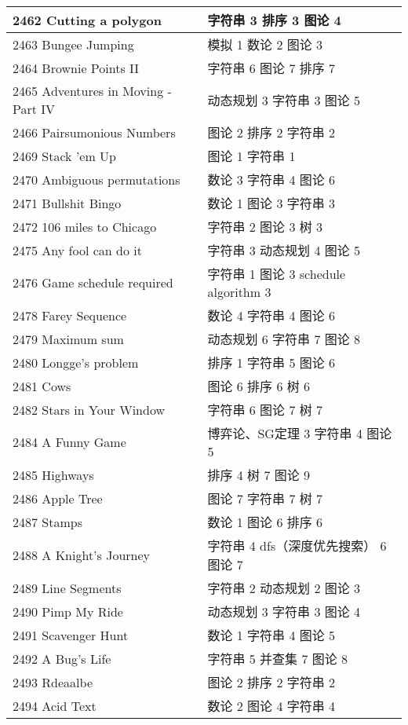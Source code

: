 \begin{longtable}{| p{} | p{} |}
 2462 Cutting a polygon  & 字符串 3 排序 3 图论 4 \\ \hline
 2463 Bungee Jumping  & 模拟 1 数论 2 图论 3 \\ \hline
 2464 Brownie Points II  & 字符串 6 图论 7 排序 7 \\ \hline
 2465 Adventures in Moving - Part IV  & 动态规划 3 字符串 3 图论 5 \\ \hline
 2466 Pairsumonious Numbers  & 图论 2 排序 2 字符串 2 \\ \hline
 2469 Stack 'em Up  & 图论 1 字符串 1 \\ \hline
 2470 Ambiguous permutations  & 数论 3 字符串 4 图论 6 \\ \hline
 2471 Bullshit Bingo  & 数论 1 图论 3 字符串 3 \\ \hline
 2472 106 miles to Chicago  & 字符串 2 图论 3 树 3 \\ \hline
 2475 Any fool can do it  & 字符串 3 动态规划 4 图论 5 \\ \hline
 2476 Game schedule required  & 字符串 1 图论 3 schedule algorithm 3 \\ \hline
 2478 Farey Sequence  & 数论 4 字符串 4 图论 6 \\ \hline
 2479 Maximum sum  & 动态规划 6 字符串 7 图论 8 \\ \hline
 2480 Longge's problem  & 排序 1 字符串 5 图论 6 \\ \hline
 2481 Cows  & 图论 6 排序 6 树 6 \\ \hline
 2482 Stars in Your Window  & 字符串 6 图论 7 树 7 \\ \hline
 2484 A Funny Game  & 博弈论、SG定理 3 字符串 4 图论 5 \\ \hline
 2485 Highways  & 排序 4 树 7 图论 9 \\ \hline
 2486 Apple Tree  & 图论 7 字符串 7 树 7 \\ \hline
 2487 Stamps  & 数论 1 图论 6 排序 6 \\ \hline
 2488 A Knight's Journey  & 字符串 4 dfs（深度优先搜索） 6 图论 7 \\ \hline
 2489 Line Segments  & 字符串 2 动态规划 2 图论 3 \\ \hline
 2490 Pimp My Ride  & 动态规划 3 字符串 3 图论 4 \\ \hline
 2491 Scavenger Hunt  & 数论 1 字符串 4 图论 5 \\ \hline
 2492 A Bug's Life  & 字符串 5 并查集 7 图论 8 \\ \hline
 2493 Rdeaalbe  & 图论 2 排序 2 字符串 2 \\ \hline
 2494 Acid Text  & 数论 2 图论 4 字符串 4 \\ \hline

\end{longtable}
